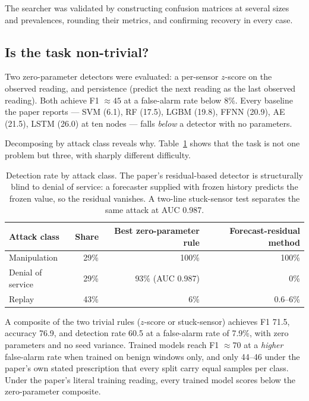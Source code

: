 \documentclass[11pt]{article}
\begin{document}
The searcher was validated by constructing confusion matrices at several sizes
and prevalences, rounding their metrics, and confirming recovery in every case.

\subsection{Is the task non-trivial?}

Two zero-parameter detectors were evaluated: a per-sensor $z$-score on the
observed reading, and persistence (predict the next reading as the last observed
reading). Both achieve F1 $\approx 45$ at a false-alarm rate below $8\%$. Every
baseline the paper reports --- SVM (6.1), RF (17.5), LGBM (19.8), FFNN (20.9),
AE (21.5), LSTM (26.0) at ten nodes --- falls \emph{below} a detector with no
parameters.

Decomposing by attack class reveals why. Table~\ref{tab:classes} shows that the
task is not one problem but three, with sharply different difficulty.

\begin{table}[t]
\centering
\begin{tabular}{lrrr}
\toprule
Attack class & Share & Best zero-parameter rule & Forecast-residual method \\
\midrule
Manipulation & 29\% & 100\% & 100\% \\
Denial of service & 29\% & 93\% (AUC 0.987) & 0\% \\
Replay & 43\% & 6\% & 0.6--6\% \\
\bottomrule
\end{tabular}
\caption{Detection rate by attack class. The paper's residual-based detector is
structurally blind to denial of service: a forecaster supplied with frozen
history predicts the frozen value, so the residual vanishes. A two-line
stuck-sensor test separates the same attack at AUC 0.987.}
\label{tab:classes}
\end{table}

A composite of the two trivial rules ($z$-score or stuck-sensor) achieves
F1 71.5, accuracy 76.9, and detection rate 60.5 at a false-alarm rate of 7.9\%,
with zero parameters and no seed variance. Trained models reach F1 $\approx 70$
at a \emph{higher} false-alarm rate when trained on benign windows only, and
only 44--46 under the paper's own stated prescription that every split carry
equal samples per class. Under the paper's literal training reading, every
trained model scores below the zero-parameter composite.
\end{document}
